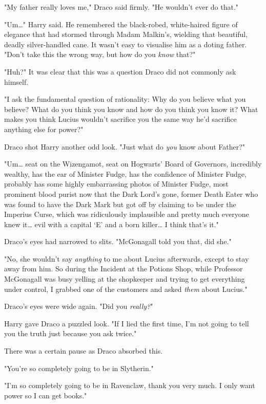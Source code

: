 "My father really loves me," Draco said firmly. "He wouldn't ever do that."

"Um{\ldots}" Harry said. He remembered the black-robed, white-haired figure of
elegance that had stormed through Madam Malkin's, wielding that beautiful,
deadly silver-handled cane. It wasn't easy to visualise him as a doting father.
"Don't take this the wrong way, but how do you \emph{know} that?"

"Huh?" It was clear that this was a question Draco did not commonly ask himself.

"I ask the fundamental question of rationality: Why do you believe what you
believe? What do you think you know and how do you think you know it? What
makes you think Lucius wouldn't sacrifice you the same way he'd sacrifice
anything else for power?"

Draco shot Harry another odd look. "Just what do \emph{you} know about Father?"

"Um{\ldots} seat on the Wizengamot, seat on Hogwarts' Board of Governors,
incredibly wealthy, has the ear of Minister Fudge, has the confidence of
Minister Fudge, probably has some highly embarrassing photos of Minister Fudge,
most prominent blood purist now that the Dark Lord's gone, former Death Eater
who was found to have the Dark Mark but got off by claiming to be under the
Imperius Curse, which was ridiculously implausible and pretty much everyone
knew it{\ldots} evil with a capital `E' and a born killer{\ldots} I think
that's it."

Draco's eyes had narrowed to slits. "McGonagall told you that, did she."

"No, she wouldn't say \emph{anything} to me about Lucius afterwards, except to
stay away from him. So during the Incident at the Potions Shop, while Professor
McGonagall was busy yelling at the shopkeeper and trying to get everything
under control, I grabbed one of the customers and asked \emph{them} about
Lucius."

Draco's eyes were wide again. "Did you \emph{really?}"

Harry gave Draco a puzzled look. "If I lied the first time, I'm not going to
tell you the truth just because you ask twice."

There was a certain pause as Draco absorbed this.

"You're so completely going to be in Slytherin."

"I'm so completely going to be in Ravenclaw, thank you very much. I only want
power so I can get books."

